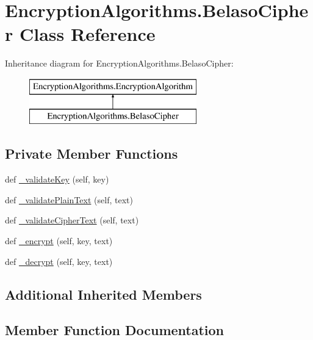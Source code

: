\hypertarget{classEncryptionAlgorithms_1_1BelasoCipher}{}\section{Encryption\+Algorithms.\+Belaso\+Cipher Class Reference}
\label{classEncryptionAlgorithms_1_1BelasoCipher}
Inheritance diagram for Encryption\+Algorithms.\+Belaso\+Cipher\+:\begin{figure}[H]
\begin{center}
\leavevmode
\includegraphics[height=2.000000cm]{classEncryptionAlgorithms_1_1BelasoCipher}
\end{center}
\end{figure}
\subsection*{Private Member Functions}
\begin{DoxyCompactItemize}
\item 
def \mbox{\hyperlink{classEncryptionAlgorithms_1_1BelasoCipher_a3a22e598ed13e45113525b83f21edc39}{\+\_\+validate\+Key}} (self, key)
\item 
def \mbox{\hyperlink{classEncryptionAlgorithms_1_1BelasoCipher_ae1a862a944f83bcfd1a69548d0127025}{\+\_\+validate\+Plain\+Text}} (self, text)
\item 
def \mbox{\hyperlink{classEncryptionAlgorithms_1_1BelasoCipher_a27be6c3ef5ece5d4f7f2c07bd6018c22}{\+\_\+validate\+Cipher\+Text}} (self, text)
\item 
def \mbox{\hyperlink{classEncryptionAlgorithms_1_1BelasoCipher_ae7294f9e4900ceafbdcc4bd2c855a7e9}{\+\_\+encrypt}} (self, key, text)
\item 
def \mbox{\hyperlink{classEncryptionAlgorithms_1_1BelasoCipher_a65864039ed30946238a13105f8d53bde}{\+\_\+decrypt}} (self, key, text)
\end{DoxyCompactItemize}
\subsection*{Additional Inherited Members}


\subsection{Member Function Documentation}
\mbox{\label{classEncryptionAlgorithms_1_1BelasoCipher_a65864039ed30946238a13105f8d53bde}} 
